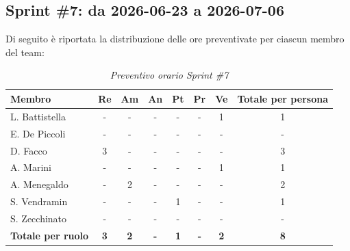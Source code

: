 \documentclass[a4paper, 10pt, colorlinks=true, linkcolor=black, urlcolor=blue, citecolor=blue, hidelinks]{article}
\renewcommand{\arraystretch}{1.2}
\begin{document}
\subsection{Sprint \#7: da 2026-06-23 a 2026-07-06}
Di seguito è riportata la distribuzione delle ore preventivate per ciascun membro del team:

\begin{table}[H]
    \centering
    \renewcommand{\arraystretch}{1.4}
    \begin{tabular}{|l|c|c|c|c|c|c|c|}
        \hline
        \rowcolor{bluBitless!15}
        \textbf{Membro} & \textbf{Re} & \textbf{Am} & \textbf{An} & \textbf{Pt} & \textbf{Pr} & \textbf{Ve} & \textbf{Totale per persona} \\
        \hline
        L. Battistella & - & - & - & - & - & 1 & 1 \\ \hline
        E. De Piccoli & - & - & - & - & - & - & - \\ \hline
        D. Facco & 3 & - & - & - & - & - & 3 \\ \hline
        A. Marini & - & - & - & - & - & 1 & 1 \\ \hline
        A. Menegaldo & - & 2 & - & - & - & - & 2 \\ \hline
        S. Vendramin & - & - & - & 1 & - & - & 1 \\ \hline
        S. Zecchinato & - & - & - & - & - & - & - \\ \hline
        \rowcolor{bluBitless!8}
        \textbf{Totale per ruolo} & \textbf{3} & \textbf{2} & \textbf{-} & \textbf{1} & \textbf{-} & \textbf{2} & \textbf{8} \\
        \hline
    \end{tabular}
    \caption{\textit{Preventivo orario Sprint \#7}}
\end{table}
\end{document}
